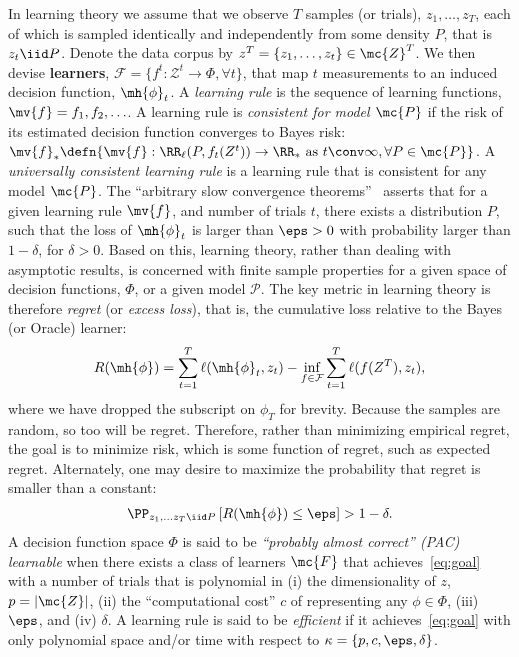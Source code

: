 \documentclass{article}
\begin{document}
In learning theory we assume that we observe $T$ samples (or trials), $z_1,\ldots, z_T$, each of which is sampled identically and independently from some density $P$, that is $z_t \iid P$.  Denote the data corpus by $z^T =\{z_1,\ldots, z_t\} \in \mc{Z}^T$.  
We then devise  \textbf{learners}, $\mathcal{F} = \{f^t : \mathcal{Z}^t \to \Phi, \forall t\}$, that map $t$ measurements to an induced decision function, $\mh{\phi}_t$. 
A \emph{learning rule} is the sequence of learning functions, $\mv{f}= f_1,f_2,\ldots$.  A learning rule is \emph{consistent for model $\mc{P}$} if the risk of its estimated decision function converges to Bayes risk:
$\mv{f}_* \defn \{ \mv{f} : \RR_\ell(P,f_t(Z^t)) \to \RR_* \text{ as } t \conv \infty, \forall P \in \mc{P} \}$.
A \emph{universally consistent learning rule} is a learning rule that is consistent for any model $\mc{P}$. 
%
The ``arbitrary slow convergence theorems''~\cite{Devroye1997-bd}  asserts that for a given learning rule $\mv{f}$, and number of trials $t$, there exists a distribution $P$, such that the loss of $\mh{\phi}_t$ is larger than $\eps > 0$ with  probability larger than $1-\delta$, for $\delta>0$.   Based on this, learning theory, rather than dealing with asymptotic results, is concerned with finite sample properties for a given space of decision functions, $\Phi$, or a given model $\mathcal{P}$. 
The key metric in  learning theory is therefore \emph{regret} (or \emph{excess loss}), that is, the cumulative loss relative to the Bayes (or Oracle) learner:
\begin{align}
    R(\mh{\phi}) = \sum_{t=1}^T \ell(\mh{\phi}_t, z_t) - \inf_{f \in \mathcal{F}} \sum_{t=1}^T \ell ( f(Z^T), z_t),
\end{align}
where we have dropped the subscript on $\phi_T$ for brevity. 
Because the samples  are random, so too will be regret.  Therefore, rather than minimizing empirical regret, the goal is to minimize risk, which is some function of regret, such as expected regret. 
% 
Alternately, one may desire to maximize the probability that  regret is smaller than a constant:
\begin{align} \label{eq:goal}
    \PP_{ z_1,\ldots z_T \iid P} \left[R(\mh{\phi})  \leq \eps \right] > 1 - \delta.
\end{align}
A decision function space $\Phi$ is said to be \emph{``probably almost correct'' (PAC) learnable} when there exists a class of learners $\mc{F}$ that achieves~\eqref{eq:goal} with a  number of trials that is polynomial in (i) the dimensionality of $z$, $p=|\mc{Z}|$, (ii) the ``computational cost'' $c$ of representing any $\phi \in \Phi$, (iii) $\eps$, and  (iv) $\delta$.  A learning rule is said to be \emph{efficient} if it achieves~\eqref{eq:goal} with only polynomial space and/or time with respect to $\kappa= \{p,c,\eps,\delta\}$.  
\end{document}
